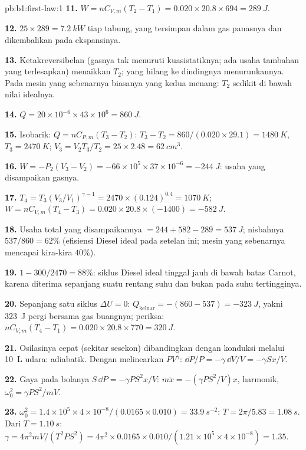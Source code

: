 \begin{solution}{pb:b1:first-law:1}
\textbf{11.} $W = nC_{V,m}(T_2 - T_1) = 0.020 \times 20.8 \times 694 = \qty{289}{J}$.

\textbf{12.} $25 \times 289 = \qty{7.2}{kW}$ tiap tabung, yang tersimpan dalam gas
panasnya dan dikembalikan pada ekspansinya.

\textbf{13.} Ketakreversibelan (gasnya tak menuruti 
kuasistatiknya; ada usaha tambahan yang terlesapkan) menaikkan $T_2$;  yang hilang ke dindingnya
menurunkannya. Pada mesin yang sebenarnya biasanya yang kedua menang: $T_2$ sedikit
di bawah nilai idealnya.

\textbf{14.} $Q = 20\times10^{-6} \times 43\times10^6 = \qty{860}{J}$.

\textbf{15.} Isobarik: $Q = nC_{P,m}(T_3 - T_2)$: $T_3 - T_2 = 860/(0.020 \times
29.1) = \qty{1480}{K}$, $T_3 = \qty{2470}{K}$; $V_3 = V_2T_3/T_2 = 25 \times
2.48 = \qty{62}{cm^3}$.

\textbf{16.} $W = -P_2(V_3 - V_2) = -66\times10^5 \times 37\times10^{-6} =
\qty{-244}{J}$: usaha yang disampaikan gasnya.

\textbf{17.} $T_4 = T_3(V_3/V_1)^{\gamma - 1} = 2470 \times (0.124)^{0.4} =
\qty{1070}{K}$; $W = nC_{V,m}(T_4 - T_3) = 0.020 \times 20.8 \times (-1400) =
\qty{-582}{J}$.

\textbf{18.} Usaha total yang disampaikannya $= 244 + 582 - 289 = \qty{537}{J}$; nisbahnya
$537/860 = 62\%$ (efisiensi Diesel ideal pada setelan ini; mesin
yang sebenarnya mencapai kira-kira $40\%$).

\textbf{19.} $1 - 300/2470 = 88\%$: siklus Diesel ideal tinggal jauh
di bawah batas Carnot, karena  diterima sepanjang suatu rentang
suhu dan bukan pada suhu tertingginya.

\textbf{20.} Sepanjang satu siklus $\Delta U = 0$: $Q_{\text{keluar}} = -(860 - 537) =
\qty{-323}{J}$, yakni \qty{323}{J} pergi bersama gas buangnya; periksa:
$nC_{V,m}(T_4 - T_1) = 0.020 \times 20.8 \times 770 = \qty{320}{J}$.

\textbf{21.} Osilasinya cepat (sekitar sesekon) dibandingkan dengan konduksi
 melalui \qty{10}{L} udara: adiabatik. Dengan melinearkan
$PV^\gamma$: $\dd P/P = -\gamma\,\dd V/V = -\gamma Sx/V$.

\textbf{22.} Gaya pada bolanya $S\,\dd P = -\gamma PS^2x/V$: $m\ddot x =
-(\gamma PS^2/V)x$, harmonik, $\omega_0^2 = \gamma PS^2/mV$.

\textbf{23.} $\omega_0^2 = 1.4 \times 10^5 \times 4\times10^{-8}/(0.0165 \times 0.010)
= \qty{33.9}{s^{-2}}$: $T = 2\pi/5.83 = \qty{1.08}{s}$. Dari $T = \qty{1.10}{s}$:
$\gamma = 4\pi^2mV/(T^2PS^2) = 4\pi^2 \times 0.0165 \times 0.010/(1.21 \times 10^5
\times 4\times10^{-8}) = 1.35$.


\end{solution}
